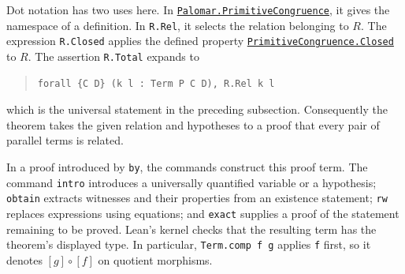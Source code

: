 \documentclass[11pt]{article}
\begin{document}
Dot notation has two uses here. In
\href{https://github.com/flengyel/Dosen-Petric-Maximality/blob/5dbee39bea09539bd130f729e82636419f71f920/DosenPetric/PalomarDefinitions.lean\#L14}{\texttt{Palomar.PrimitiveCongruence}}, it gives the namespace of a
definition. In \texttt{R.Rel}, it selects the relation belonging
to $R$. The expression \texttt{R.Closed} applies the defined
property \href{https://github.com/flengyel/Dosen-Petric-Maximality/blob/5dbee39bea09539bd130f729e82636419f71f920/DosenPetric/PalomarDefinitions.lean\#L31}{\texttt{PrimitiveCongruence.Closed}} to $R$.
The assertion \texttt{R.Total} expands to
\begin{quote}
\begin{verbatim}
forall {C D} (k l : Term P C D), R.Rel k l
\end{verbatim}
\end{quote}
which is the universal statement in the preceding subsection.
Consequently the theorem takes the given relation and hypotheses
to a proof that every pair of parallel terms is related.

In a proof introduced by \texttt{by}, the commands construct this
proof term. The command \texttt{intro} introduces a universally
quantified variable or a hypothesis; \texttt{obtain} extracts
witnesses and their properties from an existence statement;
\texttt{rw} replaces expressions using equations; and
\texttt{exact} supplies a proof of the statement remaining to
be proved. Lean's kernel checks that the resulting term has the theorem's displayed type.
In particular, \texttt{Term.comp f g} applies \texttt{f} first,
so it denotes $[g]\circ[f]$ on quotient morphisms.
\end{document}
